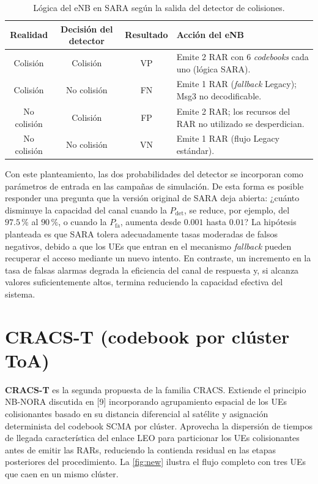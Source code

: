 \begin{table}[!ht]
\centering
\caption{Lógica del eNB en SARA según la salida del detector de colisiones.}
\label{tab:collision_detector_logic}
\begin{tabular}{|c|c|c|p{8cm}|}
\hline
\textbf{Realidad} & \textbf{Decisión del detector} & \textbf{Resultado} & \textbf{Acción del eNB} \\
\hline
Colisión & Colisión & VP & Emite 2 RAR con 6 \textit{codebooks} cada uno (lógica SARA). \\
\hline
Colisión & No colisión & FN & Emite 1 RAR (\textit{fallback} Legacy); Msg3 no decodificable. \\
\hline
No colisión & Colisión & FP & Emite 2 RAR; los recursos del RAR no utilizado se desperdician. \\
\hline
No colisión & No colisión & VN & Emite 1 RAR (flujo Legacy estándar). \\
\hline
\end{tabular}
\end{table}

Con este planteamiento, las dos probabilidades del detector se incorporan como parámetros de entrada en las campañas de simulación. De esta forma es posible responder una pregunta que la versión original de SARA deja abierta: ¿cuánto disminuye la capacidad del canal cuando la $P_{\mathrm{det}}$, se reduce, por ejemplo, del $97.5\,\%$ al $90\,\%$, o cuando la $P_{\mathrm{fa}}$, aumenta desde $0.001$ hasta $0.01$? La hipótesis planteada es que SARA tolera adecuadamente tasas moderadas de falsos negativos, debido a que los UEs que entran en el mecanismo \textit{fallback} pueden recuperar el acceso mediante un nuevo intento. En contraste, un incremento en la tasa de falsas alarmas degrada la eficiencia del canal de respuesta y, si alcanza valores suficientemente altos, termina reduciendo la capacidad efectiva del sistema.







\section{CRACS-T (codebook por clúster ToA)}
\label{sec:cracs_t}

\textbf{CRACS-T} es la segunda propuesta de la familia CRACS. Extiende el principio NB-NORA discutida en [9] incorporando agrupamiento espacial de los UEs colisionantes basado en su distancia diferencial al satélite y asignación determinista del codebook SCMA por clúster. Aprovecha la dispersión de tiempos de llegada característica del enlace LEO para particionar los UEs colisionantes antes de emitir las RARs, reduciendo la contienda residual en las etapas posteriores del procedimiento. La \cref{fig:new} ilustra el flujo completo con tres UEs que caen en un mismo clúster.

